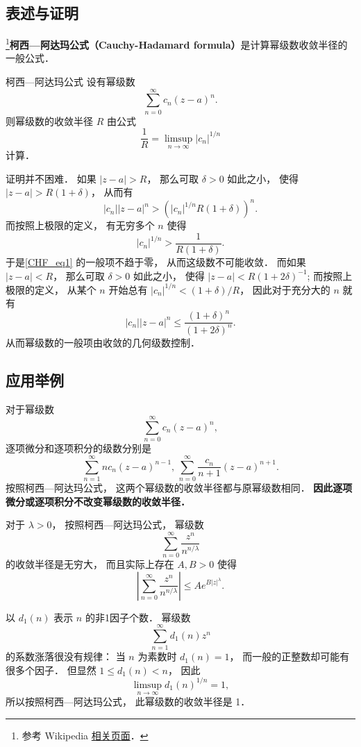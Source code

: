 

\subsection{表述与证明}

\footnote{参考 Wikipedia \href{https://en.wikipedia.org/wiki/Cauchy-Hadamard_theorem}{相关页面}．}\textbf{柯西—阿达玛公式（Cauchy-Hadamard formula）}是计算幂级数收敛半径的一般公式．

\begin{theorem}{柯西—阿达玛公式}
设有幂级数
\begin{equation}\label{CHF_eq1}
\sum_{n=0}^\infty c_n(z-a)^n.
\end{equation}
则幂级数的收敛半径 $R$ 由公式
$$
\frac{1}{R}=\limsup_{n\to\infty}|c_n|^{1/n}
$$
计算．
\end{theorem}
证明并不困难． 如果 $|z-a|>R$， 那么可取 $\delta>0$ 如此之小， 使得 $|z-a|>R(1+\delta)$， 从而有
$$
|c_n||z-a|^n>(|c_n|^{1/n}R(1+\delta))^n.
$$
而按照上极限的定义， 有无穷多个 $n$ 使得
$$
|c_n|^{1/n}>\frac{1}{R(1+\delta)}.
$$
于是\autoref{CHF_eq1} 的一般项不趋于零， 从而这级数不可能收敛． 而如果 $|z-a|<R$， 那么可取 $\delta>0$ 如此之小， 使得 $|z-a|<R(1+2\delta)^{-1}$; 而按照上极限的定义， 从某个 $n$ 开始总有 $|c_n|^{1/n}<(1+\delta)/R$， 因此对于充分大的 $n$ 就有
$$
|c_n||z-a|^n\leq\frac{(1+\delta)^n}{(1+2\delta)^n}.
$$
从而幂级数的一般项由收敛的几何级数控制．

\subsection{应用举例}
对于幂级数
$$
\sum_{n=0}^\infty c_n(z-a)^n,
$$
逐项微分和逐项积分的级数分别是
$$
\sum_{n=1}^\infty nc_n(z-a)^{n-1},\,
\sum_{n=0}^\infty \frac{c_n}{n+1}(z-a)^{n+1}.
$$
按照柯西—阿达玛公式， 这两个幂级数的收敛半径都与原幂级数相同． \textbf{因此逐项微分或逐项积分不改变幂级数的收敛半径．}

对于 $\lambda>0$， 按照柯西—阿达玛公式， 幂级数
$$
\sum_{n=0}^\infty\frac{z^n}{n^{n/\lambda}}
$$
的收敛半径是无穷大， 而且实际上存在 $A,B>0$ 使得
$$
\left|\sum_{n=0}^\infty\frac{z^n}{n^{n/\lambda}}\right|
\leq Ae^{B|z|^\lambda}.
$$

以 $d_1(n)$ 表示 $n$ 的非1因子个数． 幂级数
$$
\sum_{n=1}^\infty d_1(n)z^n
$$
的系数涨落很没有规律： 当 $n$ 为素数时 $d_1(n)=1$， 而一般的正整数却可能有很多个因子． 但显然 $1\leq d_1(n)<n$， 因此
$$
\limsup_{n\to\infty}d_1(n)^{1/n}=1,
$$
所以按照柯西—阿达玛公式， 此幂级数的收敛半径是 1．